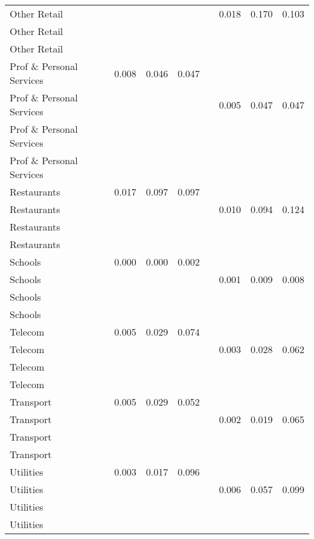 \begin{table}[ht]
\begin{tabular}{lccccccc}
  Other Retail &  &  &  &  & 0.018 & 0.170 & 0.103 \\ 
  Other Retail &  &  &  &  &  &  &  \\ 
  Other Retail &  &  &  &  &  &  &  \\ 
  Prof \& Personal Services & 0.008 & 0.046 & 0.047 &  &  &  &  \\ 
  Prof \& Personal Services &  &  &  &  & 0.005 & 0.047 & 0.047 \\ 
  Prof \& Personal Services &  &  &  &  &  &  &  \\ 
  Prof \& Personal Services &  &  &  &  &  &  &  \\ 
  Restaurants & 0.017 & 0.097 & 0.097 &  &  &  &  \\ 
  Restaurants &  &  &  &  & 0.010 & 0.094 & 0.124 \\ 
  Restaurants &  &  &  &  &  &  &  \\ 
  Restaurants &  &  &  &  &  &  &  \\ 
  Schools & 0.000 & 0.000 & 0.002 &  &  &  &  \\ 
  Schools &  &  &  &  & 0.001 & 0.009 & 0.008 \\ 
  Schools &  &  &  &  &  &  &  \\ 
  Schools &  &  &  &  &  &  &  \\ 
  Telecom & 0.005 & 0.029 & 0.074 &  &  &  &  \\ 
  Telecom &  &  &  &  & 0.003 & 0.028 & 0.062 \\ 
  Telecom &  &  &  &  &  &  &  \\ 
  Telecom &  &  &  &  &  &  &  \\ 
  Transport & 0.005 & 0.029 & 0.052 &  &  &  &  \\ 
  Transport &  &  &  &  & 0.002 & 0.019 & 0.065 \\ 
  Transport &  &  &  &  &  &  &  \\ 
  Transport &  &  &  &  &  &  &  \\ 
  Utilities & 0.003 & 0.017 & 0.096 &  &  &  &  \\ 
  Utilities &  &  &  &  & 0.006 & 0.057 & 0.099 \\ 
  Utilities &  &  &  &  &  &  &  \\ 
  Utilities &  &  &  &  &  &  &  \\ 
   \bottomrule\end{tabular}
\end{table}
